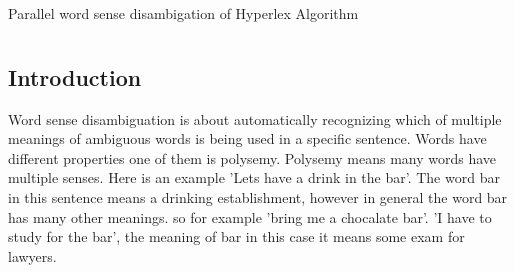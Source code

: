 \documentclass[article,dr=phil,type=drfinal,colorback,accentcolor=tud9c]{tudthesis}
\begin{document}
    {Parallel word sense disambigation of Hyperlex Algorithm}
  \author{Viswanath Vadhri}
  \dateofexam{\today}{\today}
  \makethesistitle

\newpage
\begin{abstract}
Word sense disambiguation (WSD) is the ability to identify the intended meanings of words (word senses) in a context. It is a central research topic in Natural Language Processing (NLP). Word sense disambiguation is often characterized as an intermediate task, which is not an end in itself, but essential for many applications requiring broad-coverage language understanding. Examples include machine translation, information retrieval, information extraction or text mining.

Hyperlex is an unsupervised graph-based technique used in Natural Language Processing that is capable of automatically determining word senses from a large text base without recourse to a dictionary with excellent precision. In this thesis, we design and implement the Hyperlex algorithm as a scalable application which runs on the cluster and can process data of magnitude Terabytes. We analyse the results of the implementation.


\end{abstract}


\newpage
\tableofcontents

\newpage
\chapter{}
  \section{Introduction}
  Word sense disambiguation is about automatically recognizing which of multiple meanings of ambiguous words is being used in a specific sentence. Words have different properties one of them is polysemy. Polysemy means many words have multiple senses. Here is an example 'Lets have a drink in the bar'. The word bar in this sentence means a drinking establishment, however in general the word bar has many other meanings. so for example 'bring me a chocalate bar'. 'I have to study for the bar', the meaning of bar in this case it means some exam for lawyers.
\end{document}
